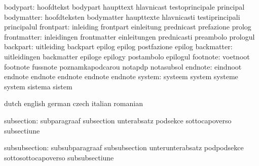                  bodypart: hoofdtekst                bodypart
                           haupttext                 hlavnicast
                           testoprincipale           principal %
               bodymatter: hoofdteksten              bodymatter
                           haupttexte                hlavnicasti
                           testiprincipali           principalul %
                frontpart: inleiding                 frontpart
                           einleitung                prednicast
                           prefazione                prolog
              frontmatter: inleidingen               frontmatter
                           einleitungen              prednicasti
                           preambolo                 prologul
                 backpart: uitleiding                backpart
                           epilog                    epilog
                           postfazione               epilog %
               backmatter: uitleidingen              backmatter
                           epiloge                   epilogy
                           postambolo                epilogul %
                 footnote: voetnoot                  footnote
                           fussnote                  poznamkapodcarou
                           notapdp                   notasubsol
                  endnote: eindnoot                  endnote
                           endnote                   endnote
                           endnote                   endnote
                   system: systeem                   system
                           systeme                   system
                           sistema                   sistem

\stopvariables


\startvariables         dutch                                    english
                        german                                   czech
                        italian                                  romanian

            subsection: subparagraaf                             subsection
                        unterabsatz                              podsekce
                        sottocapoverso                           subsectiune

         subsubsection: subsubparagraaf                          subsubsection
                        unterunterabsatz                         podpodsekce
                        sottosottocapoverso                      subsubsectiune

